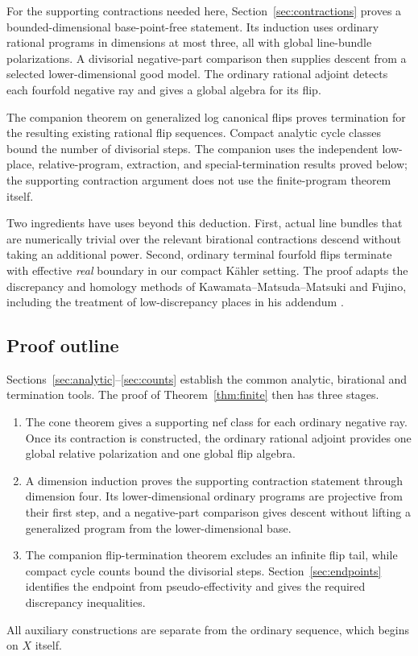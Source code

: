 For the supporting contractions needed here, Section~\ref{sec:contractions}
proves a bounded-dimensional base-point-free statement. Its induction
uses ordinary rational programs in dimensions at most three, all with
global line-bundle polarizations. A divisorial negative-part comparison
then supplies descent from a selected lower-dimensional good model.
The ordinary rational adjoint detects each fourfold negative ray and
gives a global algebra for its flip.

The companion theorem on generalized log canonical flips
\cite[Theorem~1.1]{OAI:Termination-of-generalized-log-canonical-flips-on-compact-Kahler-fourfolds-October-7-2026}
proves termination for the resulting existing rational flip sequences.
Compact analytic cycle classes bound the number of divisorial steps.
The companion uses the independent low-place, relative-program,
extraction, and special-termination results proved below; the supporting
contraction argument does not use the finite-program theorem itself.

Two ingredients have uses beyond this deduction. First, actual line
bundles that are numerically trivial over the relevant birational
contractions descend without taking an additional power. Second,
ordinary terminal fourfold flips terminate with effective \emph{real}
boundary in our compact Kähler setting. The proof adapts the
discrepancy and homology methods of Kawamata--Matsuda--Matsuki and
Fujino, including the treatment of low-discrepancy places in his addendum
\cite{KMM1987,Fujino2004,Fujino2005Addendum}.

\subsection{Proof outline}

Sections~\ref{sec:analytic}--\ref{sec:counts} establish the common
analytic, birational and termination tools. The proof of
Theorem~\ref{thm:finite} then has three stages.
\begin{enumerate}[label=\textup{\arabic*.}]
\item The cone theorem gives a supporting nef class for each ordinary
negative ray. Once its contraction is constructed, the ordinary
rational adjoint provides one global relative polarization and one
global flip algebra.
\item A dimension induction proves the supporting contraction
statement through dimension four. Its lower-dimensional ordinary
programs are projective from their first step, and a negative-part
comparison gives descent without lifting a generalized program from
the lower-dimensional base.
\item The companion flip-termination theorem excludes an infinite
flip tail, while compact cycle counts bound the divisorial steps.
Section~\ref{sec:endpoints} identifies the endpoint from
pseudo-effectivity and gives the required discrepancy inequalities.
\end{enumerate}
All auxiliary constructions are separate from the ordinary sequence,
which begins on $X$ itself.

